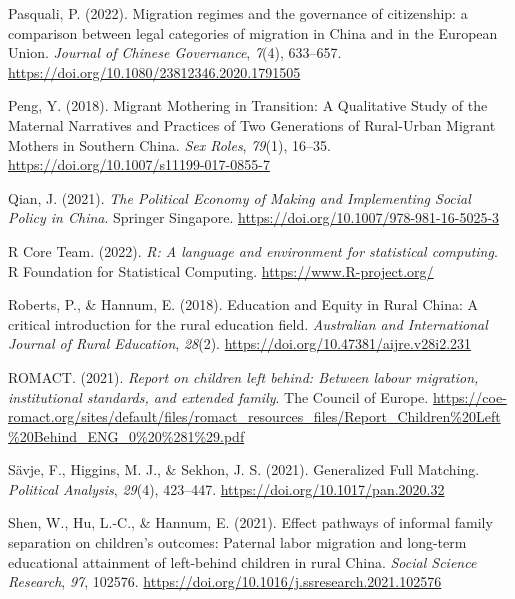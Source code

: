 \documentclass[
  man,floatsintext]{apa7}
\newlength{\cslhangindent}
\newlength{\cslentryspacingunit} %
\newenvironment{CSLReferences}[2] %
 {%
  \setlength{\parindent}{0pt}
  \ifodd #1
  \let\oldpar\par
  \def\par{\hangindent=\cslhangindent\oldpar}
  \fi
  \setlength{\parskip}{#2\cslentryspacingunit}
 }%
 {}
\begin{document}
\begin{CSLReferences}{1}{0}
\leavevmode{}%
Pasquali, P. (2022). Migration regimes and the governance of citizenship: a comparison between legal categories of migration in {China} and in the European Union. \emph{Journal of Chinese Governance}, \emph{7}(4), 633--657. \url{https://doi.org/10.1080/23812346.2020.1791505}

\leavevmode{}%
Peng, Y. (2018). Migrant Mothering in Transition: A Qualitative Study of the Maternal Narratives and Practices of Two Generations of Rural-Urban Migrant Mothers in Southern {China}. \emph{Sex Roles}, \emph{79}(1), 16--35. \url{https://doi.org/10.1007/s11199-017-0855-7}

\leavevmode{}%
Qian, J. (2021). \emph{The Political Economy of Making and Implementing Social Policy in {China}}. Springer Singapore. \url{https://doi.org/10.1007/978-981-16-5025-3}

\leavevmode{}%
R Core Team. (2022). \emph{R: A language and environment for statistical computing}. R Foundation for Statistical Computing. \url{https://www.R-project.org/}

\leavevmode{}%
Roberts, P., \& Hannum, E. (2018). Education and Equity in Rural {China}: A critical introduction for the rural education field. \emph{Australian and International Journal of Rural Education}, \emph{28}(2). \url{https://doi.org/10.47381/aijre.v28i2.231}

\leavevmode{}%
ROMACT. (2021). \emph{Report on children left behind: Between labour migration, institutional standards, and extended family}. The Council of Europe. \url{https://coe-romact.org/sites/default/files/romact_resources_files/Report_Children\%20Left\%20Behind_ENG_0\%20\%281\%29.pdf}

\leavevmode{}%
Sävje, F., Higgins, M. J., \& Sekhon, J. S. (2021). Generalized Full Matching. \emph{Political Analysis}, \emph{29}(4), 423--447. \url{https://doi.org/10.1017/pan.2020.32}

\leavevmode{}%
Shen, W., Hu, L.-C., \& Hannum, E. (2021). Effect pathways of informal family separation on children's outcomes: Paternal labor migration and long-term educational attainment of left-behind children in rural {China}. \emph{Social Science Research}, \emph{97}, 102576. \url{https://doi.org/10.1016/j.ssresearch.2021.102576}


\end{CSLReferences}
\end{document}
